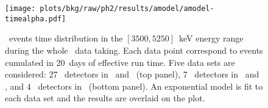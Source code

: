 
\begin{figure}
  \centering
  \texttt{[image: plots/bkg/raw/ph2/results/amodel/amodel-timealpha.pdf]}
  \caption{%
    \a\ events time distribution in the $[3500,5250]$~keV energy range during the whole
    \phasetwo\ data taking. Each data point correspond to events cumulated in 20~days of
    effective run time. Five data sets are considered: 27 \bege\ detectors in \phasetwo\ and
    \phasetwop\ (top panel), 7 \scoax\ detectors in \phasetwo\ and \phasetwop, and 4
    \icoax\ detectors in \phasetwop\ (bottom panel). An exponential model is fit to each
    data set and the results are overlaid on the plot.
  }\label{fig:bkg:raw:timealpha:results}
\end{figure}

